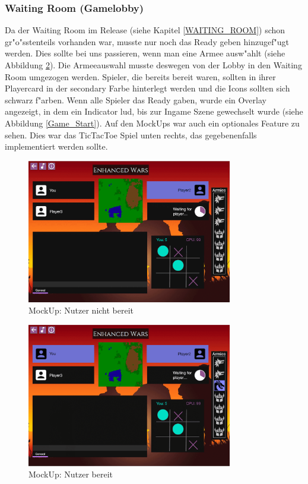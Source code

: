 \documentclass[12pt, titlepage]{scrartcl}
\newcommand{\RN}[1]{%
	\textup{\uppercase\expandafter{\romannumeral#1}}%
}
\begin{document}
		    \subsubsection{Waiting Room (Gamelobby)}
		        Da der Waiting Room im Release \RN{2} (siehe Kapitel \ref{WAITING_ROOM}) schon gr"o"sstenteils vorhanden war, musste nur noch das Ready geben hinzugef"ugt werden. Dies sollte bei uns passieren, wenn man eine Armee ausw"ahlt (siehe Abbildung \ref{Ready}). Die Armeeauswahl musste deswegen von der Lobby in den Waiting Room umgezogen werden. Spieler, die bereits bereit waren, sollten in ihrer Playercard in der secondary Farbe hinterlegt werden und die Icons sollten sich schwarz f"arben. Wenn alle Spieler das Ready gaben, wurde ein Overlay angezeigt, in dem ein Indicator lud, bis zur Ingame Szene gewechselt wurde (siehe Abbildung \ref{Game_Start}). Auf den MockUps war auch ein optionales Feature zu sehen. Dies war das TicTacToe Spiel unten rechts, das gegebenenfalls implementiert werden sollte. \\
		        \begin{figure}[H] 
    				\centering
    				\includegraphics[width=0.8\textwidth]{images/mockUps/NotReady.png}
    				\caption{MockUp: Nutzer nicht bereit}
    				\label{Not_Ready}
			    \end{figure}
			    \begin{figure}[H] 
    				\centering
    				\includegraphics[width=0.8\textwidth]{images/mockUps/Ready.png}
    				\caption{MockUp: Nutzer bereit}
    				\label{Ready}
			    \end{figure}
\end{document}
